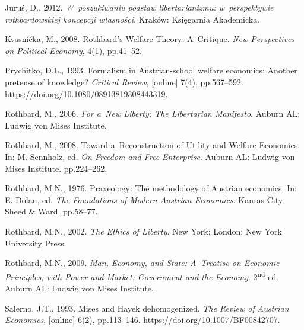 Juruś, D., 2012. \textit{W~poszukiwaniu podstaw libertarianizmu: w~perspektywie rothbardowskiej koncepcji własności}. Kraków: Księgarnia Akademicka.



Kvasnička, M., 2008. Rothbard's Welfare Theory: A~Critique. \textit{New Perspectives on Political Economy}, 4(1), pp.41–52.



Prychitko, D.L., 1993. Formalism in Austrian-school welfare economics: Another pretense of knowledge? \textit{Critical Review}, [online] 7(4), pp.567–592. https://doi.org/10.1080/08913819308443319.



Rothbard, M., 2006. \textit{For a~New Liberty: The Libertarian Manifesto}. Auburn AL: Ludwig von Mises Institute.



Rothbard, M., 2008. Toward a~Reconstruction of Utility and Welfare Economics. In: M. Sennholz, ed. \textit{On Freedom and Free Enterprise}. Auburn AL: Ludwig von Mises Institute. pp.224–262.



Rothbard, M.N., 1976. Praxeology: The methodology of Austrian economics. In: E. Dolan, ed. \textit{The Foundations of Modern Austrian Economics}. Kansas City: Sheed \& Ward. pp.58–77.



Rothbard, M.N., 2002. \textit{The Ethics of Liberty}. New York; London: New York University Press.



Rothbard, M.N., 2009. \textit{Man, Economy, and State: A~Treatise on Economic Principles; with Power and Market: Government and the Economy}. 2\textsuperscript{nd} ed. Auburn AL: Ludwig von Mises Institute.



Salerno, J.T., 1993. Mises and Hayek dehomogenized. \textit{The Review of Austrian Economics}, [online] 6(2), pp.113–146. https://doi.org/10.1007/BF00842707.



